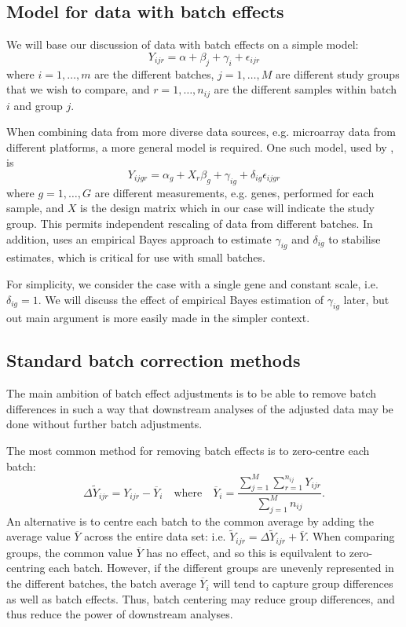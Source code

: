 \documentclass{bio}
\begin{document}
\subsection{Model for data with batch effects}

We will base our discussion of data with batch effects on a simple model:
\begin{equation}
Y_{ijr}=\alpha+\beta_j+\gamma_i+\epsilon_{ijr}
\end{equation}
where $i=1,\ldots,m$ are the different batches, $j=1,\ldots,M$ are different study groups that we wish to compare, and $r=1,\ldots,n_{ij}$ are the different samples within batch $i$ and group $j$.

When combining data from more diverse data sources, e.g. microarray data from different platforms, a more general model is required. One such model, used by \citet{Johnson2007}, is
\begin{equation}
Y_{ijgr}=\alpha_g+X_r\beta_{g}+\gamma_{ig}+\delta_{ig}\epsilon_{ijgr}
\end{equation}
where $g=1,\ldots,G$ are different measurements, e.g. genes, performed for each sample, and $X$ is the design matrix which in our case will indicate the study group. This permits independent rescaling of data from different batches. In addition, \citet{Johnson2007} uses an empirical Bayes approach to estimate $\gamma_{ig}$ and $\delta_{ig}$ to stabilise estimates, which is critical for use with small batches.

For simplicity, we consider the case with a single gene and constant scale, i.e. $\delta_{ig}=1$. We will discuss the effect of empirical Bayes estimation of $\gamma_{ig}$ later, but out main argument is more easily made in the simpler context.

\subsection{Standard batch correction methods}

The main ambition of batch effect adjustments is to be able to remove batch differences in such a way that downstream analyses of the adjusted data may be done without further batch adjustments.

The most common method for removing batch effects is to zero-centre each batch:
\begin{equation}
\Delta\widetilde Y_{ijr}=Y_{ijr}-\overline{Y}_{i}
\quad\text{where}\quad
\overline{Y}_i=\frac{\sum_{j=1}^M\sum_{r=1}^{n_{ij}} Y_{ijr}}{\sum_{j=1}^M n_{ij}}.
\end{equation}
An alternative is to centre each batch to the common average by adding the average value $\overline{Y}$ across the entire data set: i.e. $\widetilde Y_{ijr}=\Delta\widetilde Y_{ijr}+\overline{Y}$. When comparing groups, the common value $\overline{Y}$ has no effect, and so this is equilvalent to zero-centring each batch. However, if the different groups are unevenly represented in the different batches, the batch average $\overline{Y}_i$ will tend to capture group differences as well as batch effects. Thus, batch centering may reduce group differences, and thus reduce the power of downstream analyses.
\end{document}
